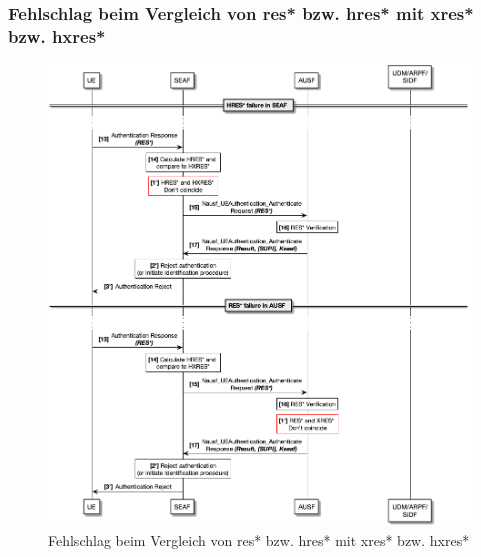 \subsubsection{Fehlschlag beim Vergleich von \gls{res*} bzw. \gls{hres*} mit \gls{xres*} bzw. \gls{hxres*}}

\begin{figure}[H]
  \centering
  \includegraphics[width=\textwidth]{uml/protocol_res*_verification_failure_v1.png}
  \caption{Fehlschlag beim Vergleich von \gls{res*} bzw. \gls{hres*} mit \gls{xres*} bzw. \gls{hxres*}}
  \label{fig:protocol_res*_verification_failure_v1}
\end{figure}

